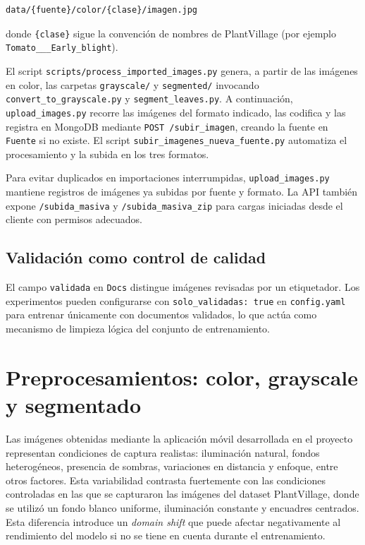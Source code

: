 \documentclass[11pt,spanish,listoffigures,listoftables]{tfgetsinf}
\begin{document}
\begin{verbatim}
data/{fuente}/color/{clase}/imagen.jpg
\end{verbatim}

donde \texttt{\{clase\}} sigue la convención de nombres de PlantVillage (por ejemplo \texttt{Tomato\_\_\_Early\_blight}).

El script \texttt{scripts/process\_imported\_images.py} genera, a partir de las imágenes en color, las carpetas \texttt{grayscale/} y \texttt{segmented/} invocando \texttt{convert\_to\_grayscale.py} y \texttt{segment\_leaves.py}. A continuación, \texttt{upload\_images.py} recorre las imágenes del formato indicado, las codifica y las registra en MongoDB mediante \texttt{POST /subir\_imagen}, creando la fuente en \texttt{Fuente} si no existe. El script \texttt{subir\_imagenes\_nueva\_fuente.py} automatiza el procesamiento y la subida en los tres formatos.

Para evitar duplicados en importaciones interrumpidas, \texttt{upload\_images.py} mantiene registros de imágenes ya subidas por fuente y formato. La API también expone \texttt{/subida\_masiva} y \texttt{/subida\_masiva\_zip} para cargas iniciadas desde el cliente con permisos adecuados.

\subsection{Validación como control de calidad}

El campo \texttt{validada} en \texttt{Docs} distingue imágenes revisadas por un etiquetador. Los experimentos pueden configurarse con \texttt{solo\_validadas: true} en \texttt{config.yaml} para entrenar únicamente con documentos validados, lo que actúa como mecanismo de limpieza lógica del conjunto de entrenamiento.

\section{Preprocesamientos: color, grayscale y segmentado}
Las imágenes obtenidas mediante la aplicación móvil desarrollada en el proyecto representan condiciones de captura realistas: iluminación natural, fondos heterogéneos, presencia de sombras, variaciones en distancia y enfoque, entre otros factores. Esta variabilidad contrasta fuertemente con las condiciones controladas en las que se capturaron las imágenes del dataset PlantVillage, donde se utilizó un fondo blanco uniforme, iluminación constante y encuadres centrados. Esta diferencia introduce un \textit{domain shift} que puede afectar negativamente al rendimiento del modelo si no se tiene en cuenta durante el entrenamiento.
\end{document}
